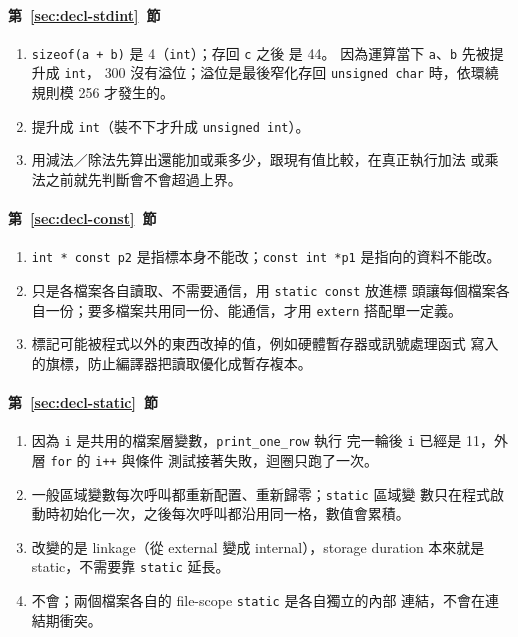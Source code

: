 \paragraph{第~\ref{sec:decl-stdint}~節}
\begin{enumerate}
\item \texttt{sizeof(a + b)} 是 4（\texttt{int}）；存回 \texttt{c} 之後
是 44。 因為運算當下 \texttt{a}、\texttt{b} 先被提升成 \texttt{int}，
$300$ 沒有溢位；溢位是最後窄化存回 \texttt{unsigned char} 時，依環繞
規則模 256 才發生的。
\item 提升成 \texttt{int}（裝不下才升成 \texttt{unsigned int}）。
\item 用減法／除法先算出還能加或乘多少，跟現有值比較，在真正執行加法
或乘法之前就先判斷會不會超過上界。
\end{enumerate}

\paragraph{第~\ref{sec:decl-const}~節}
\begin{enumerate}
\item \texttt{int * const p2} 是指標本身不能改；\texttt{const int *p1}
是指向的資料不能改。
\item 只是各檔案各自讀取、不需要通信，用 \texttt{static const} 放進標
頭讓每個檔案各自一份；要多檔案共用同一份、能通信，才用
\texttt{extern} 搭配單一定義。
\item 標記可能被程式以外的東西改掉的值，例如硬體暫存器或訊號處理函式
寫入的旗標，防止編譯器把讀取優化成暫存複本。
\end{enumerate}

\paragraph{第~\ref{sec:decl-static}~節}
\begin{enumerate}
\item 因為 \texttt{i} 是共用的檔案層變數，\texttt{print\_one\_row} 執行
完一輪後 \texttt{i} 已經是 11，外層 \texttt{for} 的 \texttt{i++} 與條件
測試接著失敗，迴圈只跑了一次。
\item 一般區域變數每次呼叫都重新配置、重新歸零；\texttt{static} 區域變
數只在程式啟動時初始化一次，之後每次呼叫都沿用同一格，數值會累積。
\item 改變的是 linkage（從 external 變成 internal），storage duration
本來就是 static，不需要靠 \texttt{static} 延長。
\item 不會；兩個檔案各自的 file-scope \texttt{static} 是各自獨立的內部
連結，不會在連結期衝突。
\end{enumerate}

